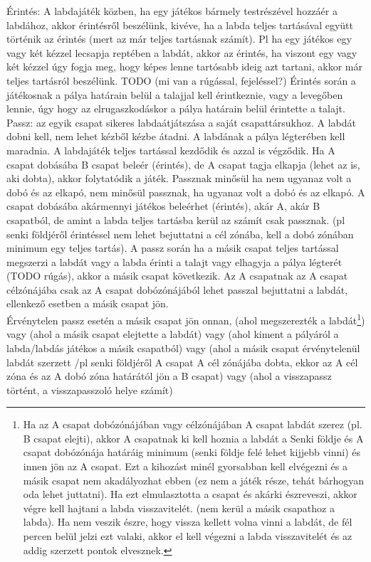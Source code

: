 \documentclass[a4paper, 12pt, twoside, openright]{article}
\begin{document}
\begin{itemize}
Érintés: A labdajáték közben, ha egy játékos bármely testrészével hozzáér a labdához, akkor érintésről beszélünk, kivéve, ha a labda teljes tartásával együtt történik az érintés (mert az már teljes tartásnak számít). Pl ha egy játékos egy vagy két kézzel lecsapja reptében a labdát, akkor az érintés, ha viszont egy vagy két kézzel úgy fogja meg, hogy képes lenne tartósabb ideig azt tartani, akkor már teljes tartásról beszélünk. TODO (mi van a rúgással, fejeléssel?)
Érintés során a játékosnak a pálya határain belül a talajjal kell érintkeznie, vagy a levegőben lennie, úgy hogy az elrugaszkodáskor a pálya határain belül érintette a talajt.\\
Passz: az egyik csapat sikeres labdaátjátszása a saját csapattársukhoz. A labdát dobni kell, nem lehet kézből kézbe átadni. A labdának a pálya légterében kell maradnia. A labdajáték teljes tartással kezdődik és azzal is végződik. Ha A csapat dobásába B csapat beleér (érintés), de A csapat tagja elkapja (lehet az is, aki dobta), akkor folytatódik a játék. Passznak minősül ha nem ugyanaz volt a dobó és az elkapó, nem minősül passznak, ha ugyanaz volt a dobó és az elkapó. A csapat dobásába akármennyi játékos beleérhet (érintés), akár A, akár B csapatból, de amint a labda teljes tartásba kerül az számít csak passznak. (pl senki földjéről érintéssel nem lehet bejuttatni a cél zónába, kell a dobó zónában minimum egy teljes tartás). A passz során ha a másik csapat teljes tartással megszerzi a labdát vagy a labda érinti a talajt vagy elhagyja a pálya légterét (TODO rúgás), akkor a másik csapat következik. Az A csapatnak az A csapat célzónájába csak az A csapat dobózónájából lehet passzal bejuttatni a labdát, ellenkező esetben a másik csapat jön.\\
Érvénytelen passz esetén a másik csapat jön onnan, (ahol megszerezték a labdát\footnote{Ha az A csapat dobózónájában vagy célzónájában A csapat labdát szerez (pl. B csapat elejti), akkor A csapatnak ki kell hoznia a labdát a Senki földje és A csapat dobózónája határáig minimum (senki földje felé lehet kijjebb vinni) és innen jön az A csapat. Ezt a kihozást minél gyorsabban kell elvégezni és a másik csapat nem akadályozhat ebben (ez nem a játék része, tehát bárhogyan oda lehet juttatni). Ha ezt elmulasztotta a csapat és akárki észreveszi, akkor végre kell hajtani a labda visszavitelét. (nem kerül a másik csapathoz a labda). Ha nem veszik észre, hogy vissza kellett volna vinni a labdát, de fél percen belül jelzi ezt valaki, akkor el kell végezni a labda visszavitelét és az addig szerzett pontok elvesznek.}) vagy (ahol a másik csapat elejtette a labdát\footnotemark[\value{footnote}]) vagy (ahol kiment a pályáról a labda/labdás játékos a másik csapatból\footnotemark[\value{footnote}]) vagy (ahol a másik csapat érvénytelenül labdát szerzett /pl senki földjéről A csapat A cél zónájába dobta, ekkor az A cél zóna és az A dobó zóna határától jön a B csapat) vagy (ahol a visszapassz történt, a visszapasszoló helye számít\footnotemark[\value{footnote}]) \\

\end{itemize}
\end{document}
